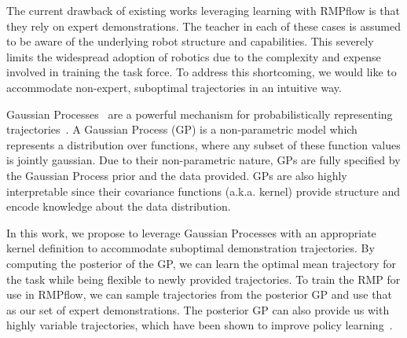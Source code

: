 The current drawback of existing works leveraging learning with RMPflow is that they rely on expert demonstrations. The teacher in each of these cases is assumed to be aware of the underlying robot structure and capabilities. This severely limits the widespread adoption of robotics due to the complexity and expense involved in training the task force. To address this shortcoming, we would like to accommodate non-expert, suboptimal trajectories in an intuitive way.

Gaussian Processes~\cite{Rasmussen04book} are a powerful mechanism for probabilistically representing trajectories~\cite{vanWaveren22manuscript}. A Gaussian Process (GP) is a non-parametric model which represents a distribution over functions, where any subset of these function values is jointly gaussian. Due to their non-parametric nature, GPs are fully specified by the Gaussian Process prior and the data provided. GPs are also highly interpretable since their covariance functions (a.k.a. kernel) provide structure and encode knowledge about the data distribution.

In this work, we propose to leverage Gaussian Processes with an appropriate kernel definition to accommodate suboptimal demonstration trajectories. By computing the posterior of the GP, we can learn the optimal mean trajectory for the task while being flexible to newly provided trajectories.
To train the RMP for use in RMPflow, we can sample trajectories from the posterior GP and use that as our set of expert demonstrations. The posterior GP can also provide us with highly variable trajectories, which have been shown to improve policy learning~\cite{Duan17neurips}.




